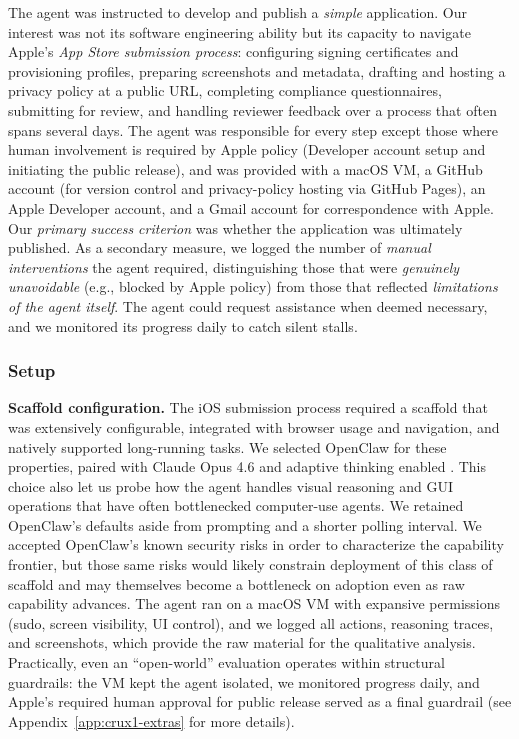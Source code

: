 \documentclass{article}
\begin{document}
The agent was instructed to develop and publish a \emph{simple} application. Our interest was not its software engineering ability but its capacity to navigate Apple's \emph{App Store submission process}: configuring signing certificates and provisioning profiles, preparing screenshots and metadata, drafting and hosting a privacy policy at a public URL, completing compliance questionnaires, submitting for review, and handling reviewer feedback over a process that often spans several days. The agent was responsible for every step except those where human involvement is required by Apple policy (Developer account setup and initiating the public release), and was provided with a macOS VM, a GitHub account (for version control and privacy-policy hosting via GitHub Pages), an Apple Developer account, and a Gmail account for correspondence with Apple. Our \emph{primary success criterion} was whether the application was ultimately published. As a secondary measure, we logged the number of \emph{manual interventions} the agent required, distinguishing those that were \emph{genuinely unavoidable} (e.g., blocked by Apple policy) from those that reflected \emph{limitations of the agent itself}. The agent could request assistance when deemed necessary, and we monitored its progress daily to catch silent stalls.

\subsubsection{Setup}\label{our-setup-for-the-agent}

\textbf{Scaffold configuration.} The iOS submission process required a scaffold that was extensively configurable, integrated with browser usage and navigation, and natively supported long-running tasks. We selected OpenClaw \citep{openclawAi} for these properties, paired with Claude Opus 4.6 and adaptive thinking enabled \citep{platformClaudeComBuild}. This choice also let us probe how the agent handles visual reasoning and GUI operations that have often bottlenecked computer-use agents. We retained OpenClaw's defaults aside from prompting and a shorter polling interval. We accepted OpenClaw's known security risks in order to characterize the capability frontier, but those same risks would likely constrain deployment of this class of scaffold and may themselves become a bottleneck on adoption even as raw capability advances. The agent ran on a macOS VM with expansive permissions (sudo, screen visibility, UI control), and we logged all actions, reasoning traces, and screenshots, which provide the raw material for the qualitative analysis. Practically, even an ``open-world'' evaluation operates within structural guardrails: the VM kept the agent isolated, we monitored progress daily, and Apple's required human approval for public release served as a final guardrail (see Appendix~\ref{app:crux1-extras} for more details).
\end{document}
